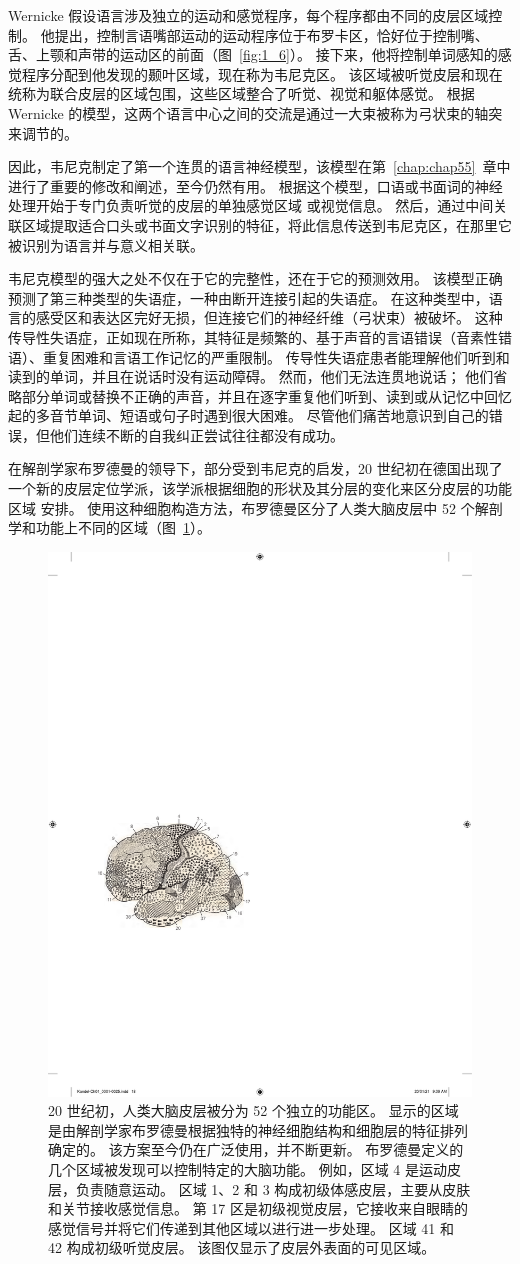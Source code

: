 Wernicke 假设语言涉及独立的运动和感觉程序，每个程序都由不同的皮层区域控制。
他提出，控制言语嘴部运动的运动程序位于布罗卡区，恰好位于控制嘴、舌、上颚和声带的运动区的前面（图~\ref{fig:1_6}）。
接下来，他将控制单词感知的感觉程序分配到他发现的颞叶区域，现在称为韦尼克区。
该区域被听觉皮层和现在统称为联合皮层的区域包围，这些区域整合了听觉、视觉和躯体感觉。
根据 Wernicke 的模型，这两个语言中心之间的交流是通过一大束被称为弓状束的轴突来调节的。


因此，韦尼克制定了第一个连贯的语言神经模型，该模型在第~\ref{chap:chap55}~章中进行了重要的修改和阐述，至今仍然有用。
根据这个模型，口语或书面词的神经处理开始于专门负责听觉的皮层的单独感觉区域 或视觉信息。
然后，通过中间关联区域提取适合口头或书面文字识别的特征，将此信息传送到韦尼克区，在那里它被识别为语言并与意义相关联。


韦尼克模型的强大之处不仅在于它的完整性，还在于它的预测效用。
该模型正确预测了第三种类型的失语症，一种由断开连接引起的失语症。
在这种类型中，语言的感受区和表达区完好无损，但连接它们的神经纤维（弓状束）被破坏。
这种传导性失语症，正如现在所称，其特征是频繁的、基于声音的言语错误（音素性错语）、重复困难和言语工作记忆的严重限制。
传导性失语症患者能理解他们听到和读到的单词，并且在说话时没有运动障碍。
然而，他们无法连贯地说话； 他们省略部分单词或替换不正确的声音，并且在逐字重复他们听到、读到或从记忆中回忆起的多音节单词、短语或句子时遇到很大困难。
尽管他们痛苦地意识到自己的错误，但他们连续不断的自我纠正尝试往往都没有成功。


在解剖学家布罗德曼的领导下，部分受到韦尼克的启发，20 世纪初在德国出现了一个新的皮层定位学派，该学派根据细胞的形状及其分层的变化来区分皮层的功能区域 安排。
使用这种细胞构造方法，布罗德曼区分了人类大脑皮层中 52 个解剖学和功能上不同的区域（图~\ref{fig:1_7}）。


\begin{figure}[htbp]
	\centering
	\includegraphics[width=0.5\linewidth]{chap01/fig_1_7}
	\caption{20 世纪初，人类大脑皮层被分为 52 个独立的功能区。
		显示的区域是由解剖学家布罗德曼根据独特的神经细胞结构和细胞层的特征排列确定的。
		该方案至今仍在广泛使用，并不断更新。
		布罗德曼定义的几个区域被发现可以控制特定的大脑功能。
		例如，区域 4 是运动皮层，负责随意运动。
		区域 1、2 和 3 构成初级体感皮层，主要从皮肤和关节接收感觉信息。
		第 17 区是初级视觉皮层，它接收来自眼睛的感觉信号并将它们传递到其他区域以进行进一步处理。
		区域 41 和 42 构成初级听觉皮层。
		该图仅显示了皮层外表面的可见区域。}
	\label{fig:1_7}
\end{figure}


